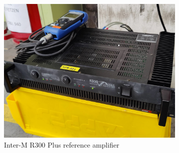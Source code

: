 \begin{figure}[H]
     \centering
     \begin{subfigure}[b]{0.5\textwidth}
         \centering
         \includegraphics[width=\textwidth]{fig/amplifier_and_signal_generator.jpg}
         \caption{Inter-M R300 Plus reference amplifier}
     \end{subfigure}
     \hspace{0.1\textwidth}
     \begin{subfigure}[b]{0.3\textwidth}
         \centering

\end{subfigure}
\end{figure}
